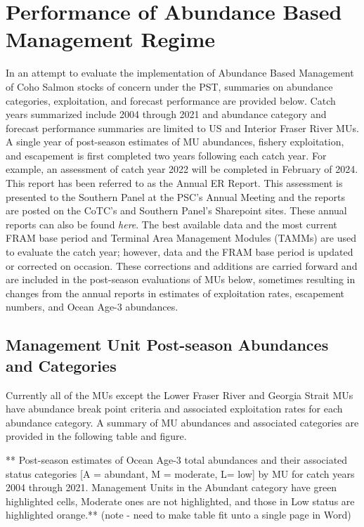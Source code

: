 \documentclass[
  letterpaper,
  DIV=11,
  numbers=noendperiod]{scrartcl}
\begin{document}
\section{Performance of Abundance Based Management
Regime}\label{performance-of-abundance-based-management-regime}

In an attempt to evaluate the implementation of Abundance Based
Management of Coho Salmon stocks of concern under the PST, summaries on
abundance categories, exploitation, and forecast performance are
provided below. Catch years summarized include 2004 through 2021 and
abundance category and forecast performance summaries are limited to US
and Interior Fraser River MUs. A single year of post-season estimates of
MU abundances, fishery exploitation, and escapement is first completed
two years following each catch year. For example, an assessment of catch
year 2022 will be completed in February of 2024. This report has been
referred to as the Annual ER Report. This assessment is presented to the
Southern Panel at the PSC's Annual Meeting and the reports are posted on
the CoTC's and Southern Panel's Sharepoint sites. These annual reports
can also be found \emph{here}. The best available data and the most
current FRAM base period and Terminal Area Management Modules (TAMMs)
are used to evaluate the catch year; however, data and the FRAM base
period is updated or corrected on occasion. These corrections and
additions are carried forward and are included in the post-season
evaluations of MUs below, sometimes resulting in changes from the annual
reports in estimates of exploitation rates, escapement numbers, and
Ocean Age-3 abundances.

\subsection{Management Unit Post-season Abundances and
Categories}\label{management-unit-post-season-abundances-and-categories}

Currently all of the MUs except the Lower Fraser River and Georgia
Strait MUs have abundance break point criteria and associated
exploitation rates for each abundance category. A summary of MU
abundances and associated categories are provided in the following table
and figure.

** Post-season estimates of Ocean Age-3 total abundances and their
associated status categories {[}A = abundant, M = moderate, L= low{]} by
MU for catch years 2004 through 2021. Management Units in the Abundant
category have green highlighted cells, Moderate ones are not
highlighted, and those in Low status are highlighted orange.** (note -
need to make table fit unto a single page in Word)
\end{document}
